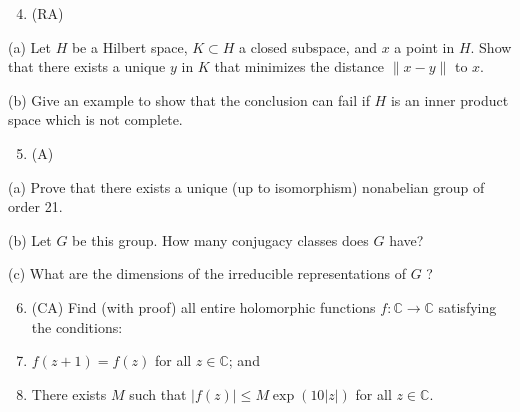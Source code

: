 \documentclass[10pt]{article}
\begin{document}
\begin{enumerate}
  \setcounter{enumi}{3}
  \item (RA)
\end{enumerate}

(a) Let $H$ be a Hilbert space, $K \subset H$ a closed subspace, and $x$ a point in $H$. Show that there exists a unique $y$ in $K$ that minimizes the distance $\|x-y\|$ to $x$.

(b) Give an example to show that the conclusion can fail if $H$ is an inner product space which is not complete.

\begin{enumerate}
  \setcounter{enumi}{4}
  \item (A)
\end{enumerate}

(a) Prove that there exists a unique (up to isomorphism) nonabelian group of order 21.

(b) Let $G$ be this group. How many conjugacy classes does $G$ have?

(c) What are the dimensions of the irreducible representations of $G$ ?

\begin{enumerate}
  \setcounter{enumi}{5}
  \item (CA) Find (with proof) all entire holomorphic functions $f: \mathbb{C} \rightarrow \mathbb{C}$ satisfying the conditions:

  \item $f(z+1)=f(z)$ for all $z \in \mathbb{C}$; and

  \item There exists $M$ such that $|f(z)| \leq M \exp (10|z|)$ for all $z \in \mathbb{C}$.

\end{enumerate}
\end{document}
